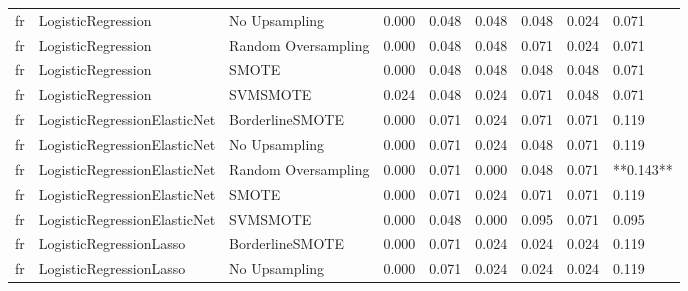 \begin{tabular}{lllllllll}
      fr &           LogisticRegression &       No Upsampling & 0.000 &                     0.048 &                 0.048 &                  0.048 &                                   0.024 &     0.071 \\
      fr &           LogisticRegression & Random Oversampling & 0.000 &                     0.048 &                 0.048 &                  0.071 &                                   0.024 &     0.071 \\
      fr &           LogisticRegression &               SMOTE & 0.000 &                     0.048 &                 0.048 &                  0.048 &                                   0.048 &     0.071 \\
      fr &           LogisticRegression &            SVMSMOTE & 0.024 &                     0.048 &                 0.024 &                  0.071 &                                   0.048 &     0.071 \\
      fr & LogisticRegressionElasticNet &     BorderlineSMOTE & 0.000 &                     0.071 &                 0.024 &                  0.071 &                                   0.071 &     0.119 \\
      fr & LogisticRegressionElasticNet &       No Upsampling & 0.000 &                     0.071 &                 0.024 &                  0.048 &                                   0.071 &     0.119 \\
      fr & LogisticRegressionElasticNet & Random Oversampling & 0.000 &                     0.071 &                 0.000 &                  0.048 &                                   0.071 & **0.143** \\
      fr & LogisticRegressionElasticNet &               SMOTE & 0.000 &                     0.071 &                 0.024 &                  0.071 &                                   0.071 &     0.119 \\
      fr & LogisticRegressionElasticNet &            SVMSMOTE & 0.000 &                     0.048 &                 0.000 &                  0.095 &                                   0.071 &     0.095 \\
      fr &      LogisticRegressionLasso &     BorderlineSMOTE & 0.000 &                     0.071 &                 0.024 &                  0.024 &                                   0.024 &     0.119 \\
      fr &      LogisticRegressionLasso &       No Upsampling & 0.000 &                     0.071 &                 0.024 &                  0.024 &                                   0.024 &     0.119 \\

\end{tabular}
